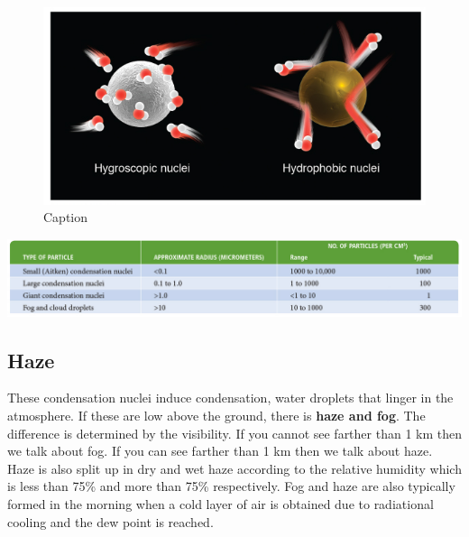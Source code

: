 \documentclass[12pt,oneside]{book}
\begin{document}
\begin{figure}

{\centering \includegraphics[width=0.8\linewidth]{figures/Figure239} 

}

\caption{Caption}\label{fig:Nuclei}
\end{figure}

\begin{center}
\label{table:droplet}

\begin{center}\includegraphics[width=0.8\linewidth]{figures/Table23} \end{center}
\end{center}

\subsection{Haze}\label{haze}

These condensation nuclei induce condensation, water droplets that
linger in the atmosphere. If these are low above the ground, there is
\textbf{haze and fog}. The difference is determined by the visibility.
If you cannot see farther than 1 km then we talk about fog. If you can
see farther than 1 km then we talk about haze. Haze is also split up in
dry and wet haze according to the relative humidity which is less than
75\% and more than 75\% respectively. Fog and haze are also typically
formed in the morning when a cold layer of air is obtained due to
radiational cooling and the dew point is reached.
\end{document}

